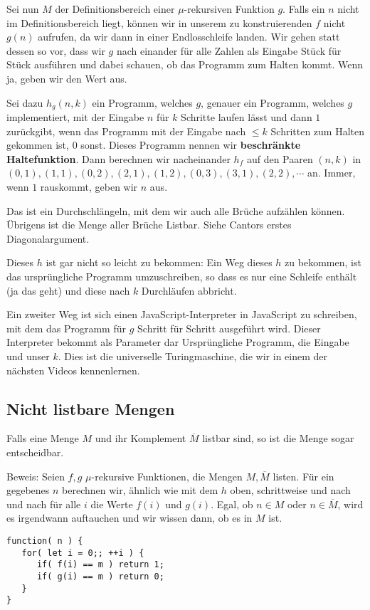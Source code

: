 \documentclass[a4paper]{amsart}
\theoremstyle{definition}
\begin{document}
Sei nun $M$ der Definitionsbereich einer $\mu$-rekursiven Funktion $g$. Falls ein $n$ nicht im Definitionsbereich liegt, können wir in unserem zu konstruierenden $f$ nicht $g(n)$ aufrufen, da wir dann in einer Endlosschleife landen. Wir gehen statt dessen so vor, dass wir $g$ nach einander für alle Zahlen als Eingabe Stück für Stück ausführen und dabei schauen, ob das Programm zum Halten kommt. Wenn ja, geben wir den Wert aus.

Sei dazu $h_g(n,k)$ ein Programm, welches $g$, genauer ein Programm, welches $g$ implementiert, mit der Eingabe $n$ für $k$ Schritte laufen lässt und dann $1$ zurückgibt, wenn das Programm mit der Eingabe nach $ \le k$ Schritten zum Halten gekommen ist, $0$ sonst. Dieses Programm nennen wir \textbf{beschränkte Haltefunktion}. Dann berechnen wir nacheinander $h_f$ auf den Paaren $(n,k)$ in $(0,1), (1,1), (0,2), (2,1), (1,2),  (0,3), (3,1), (2,2) , \cdots$ an. Immer, wenn $1$ rauskommt, geben wir $n$ aus. 

Das ist ein Durchschlängeln, mit dem wir auch alle Brüche aufzählen können. Übrigens ist die Menge aller Brüche Listbar. Siehe Cantors erstes Diagonalargument.

Dieses $h$ ist gar nicht so leicht zu bekommen:
Ein Weg dieses $h$ zu bekommen, ist das ursprüngliche Programm umzuschreiben, so dass es nur eine Schleife enthält (ja das geht) und diese nach $k$ Durchläufen abbricht.

Ein zweiter Weg ist sich einen JavaScript-Interpreter in JavaScript zu schreiben, mit dem das Programm für $g$ Schritt für Schritt ausgeführt wird. Dieser Interpreter bekommt als Parameter dar Ursprüngliche Programm, die Eingabe und unser $k$. Dies ist die universelle Turingmaschine, die wir in einem der nächsten Videos kennenlernen.

\subsection{Nicht listbare Mengen}
Falls eine Menge $M$ und ihr Komplement $\overline M$ listbar sind, so ist die Menge sogar entscheidbar.

Beweis: Seien $f,g$ $\mu$-rekursive Funktionen, die Mengen $M, \overline M$ listen. Für ein gegebenes $n$ berechnen wir, ähnlich wie mit dem $h$ oben, schrittweise und nach und nach für alle $i$ die Werte $f(i)$ und $g(i)$. Egal, ob $n \in M$ oder $n \in \overline M$, wird es irgendwann auftauchen und wir wissen dann, ob es in $M$ ist.
\begin{lstlisting}
function( n ) {
   for( let i = 0;; ++i ) {
      if( f(i) == m ) return 1;
      if( g(i) == m ) return 0;
   }
}
\end{lstlisting}
\end{document}
